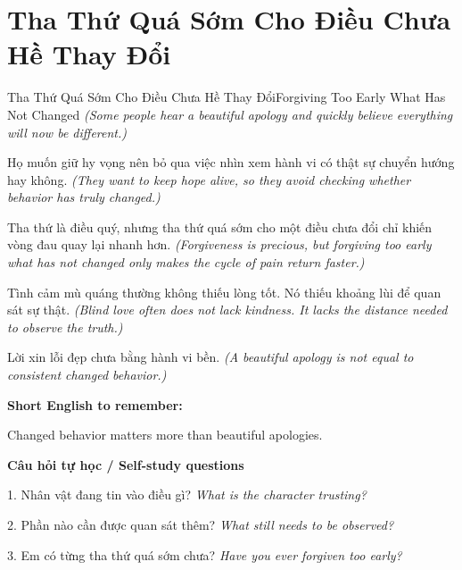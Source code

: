 \section{Tha Thứ Quá Sớm Cho Điều Chưa Hề Thay Đổi}
\begin{truyen}{Tha Thứ Quá Sớm Cho Điều Chưa Hề Thay Đổi}{Forgiving Too Early What Has Not Changed}
\textit{(Some people hear a beautiful apology and quickly believe everything will now be different.)}

Họ muốn giữ hy vọng nên bỏ qua việc nhìn xem hành vi có thật sự chuyển hướng hay không.
\textit{(They want to keep hope alive, so they avoid checking whether behavior has truly changed.)}

Tha thứ là điều quý, nhưng tha thứ quá sớm cho một điều chưa đổi chỉ khiến vòng đau quay lại nhanh hơn.
\textit{(Forgiveness is precious, but forgiving too early what has not changed only makes the cycle of pain return faster.)}

Tình cảm mù quáng thường không thiếu lòng tốt. Nó thiếu khoảng lùi để quan sát sự thật.
\textit{(Blind love often does not lack kindness. It lacks the distance needed to observe the truth.)}

\end{truyen}

\begin{baihoc}
Lời xin lỗi đẹp chưa bằng hành vi bền.
\textit{(A beautiful apology is not equal to consistent changed behavior.)}
\end{baihoc}

\begin{ghinhoanh}
\textbf{Short English to remember:}

Changed behavior matters more than beautiful apologies.

\end{ghinhoanh}

\begin{tuhocnhanh}
\textbf{Câu hỏi tự học / Self-study questions}

1. Nhân vật đang tin vào điều gì? \textit{What is the character trusting?}

2. Phần nào cần được quan sát thêm? \textit{What still needs to be observed?}

3. Em có từng tha thứ quá sớm chưa? \textit{Have you ever forgiven too early?}
\end{tuhocnhanh}
\ngancach

